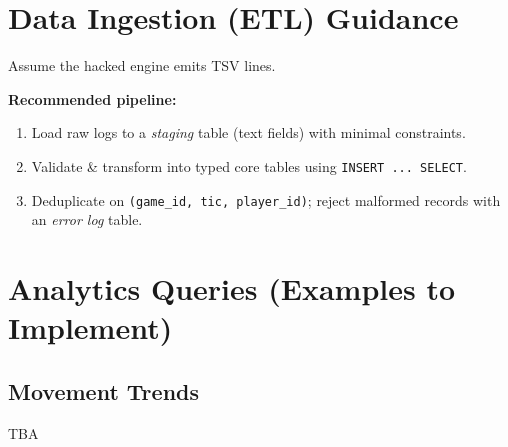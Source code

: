 \documentclass[11pt]{article}
\begin{document}
\section{Data Ingestion (ETL) Guidance}
Assume the hacked engine emits TSV lines.


\noindent \textbf{Recommended pipeline:}
\begin{enumerate}[leftmargin=*]
  \item Load raw logs to a \emph{staging} table (text fields) with minimal constraints.
  \item Validate \& transform into typed core tables using \texttt{INSERT ... SELECT}.
  \item Deduplicate on \texttt{(game\_id, tic, player\_id)}; reject malformed records with an \emph{error log} table.
\end{enumerate}

\section{Analytics Queries (Examples to Implement)}

\subsection*{Movement Trends}
TBA
\end{document}
